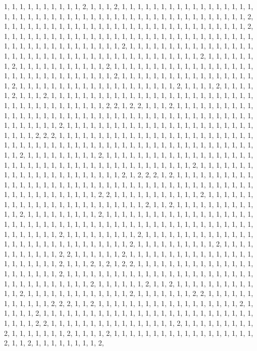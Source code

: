 \documentclass[
]{article}
\begin{document}
\begin{Schunk}
\begin{Soutput}
1, 1, 1, 1, 1, 1, 1, 1, 1, 1, 2, 1, 1, 1, 2, 1, 1, 1, 1, 1, 1, 1, 1, 1, 1, 1, 1, 1, 1, 1, 1, 1, 1, 1, 1, 1, 1, 1, 1, 1, 1, 1, 1, 1, 1, 1, 1, 1, 1, 1, 1, 1, 1, 1, 1, 1, 1, 1, 1, 1, 1, 1, 1, 2, 1, 1, 1, 1, 1, 1, 1, 1, 1, 1, 1, 1, 1, 1, 1, 1, 1, 1, 1, 1, 1, 1, 1, 1, 1, 1, 1, 1, 1, 1, 1, 2, 1, 1, 1, 1, 1, 1, 1, 1, 1, 1, 1, 1, 1, 1, 1, 1, 1, 1, 1, 1, 1, 1, 1, 1, 1, 1, 1, 1, 1, 1, 1, 1, 1, 1, 1, 1, 1, 1, 1, 1, 1, 1, 1, 1, 1, 1, 1, 2, 1, 1, 1, 1, 1, 1, 1, 1, 1, 1, 1, 1, 1, 1, 1, 1, 1, 1, 1, 1, 1, 1, 1, 1, 1, 1, 1, 1, 1, 1, 1, 1, 1, 1, 1, 1, 1, 1, 1, 1, 1, 2, 1, 1, 1, 1, 1, 1, 1, 2, 1, 1, 1, 1, 1, 1, 1, 1, 1, 1, 1, 2, 1, 1, 1, 1, 1, 1, 1, 1, 1, 1, 1, 1, 1, 1, 1, 1, 1, 1, 1, 1, 1, 1, 1, 1, 1, 1, 1, 1, 1, 1, 1, 1, 2, 1, 1, 1, 1, 1, 1, 1, 1, 1, 1, 1, 1, 1, 1, 1, 1, 1, 1, 2, 1, 1, 1, 1, 1, 1, 1, 1, 1, 1, 1, 1, 1, 1, 1, 1, 1, 1, 1, 1, 2, 1, 1, 1, 1, 2, 1, 1, 1, 1, 1, 2, 1, 1, 1, 2, 1, 1, 1, 1, 1, 1, 1, 1, 1, 1, 1, 1, 1, 1, 1, 1, 1, 1, 1, 1, 1, 1, 1, 1, 1, 1, 1, 1, 1, 1, 1, 1, 1, 1, 1, 1, 1, 1, 1, 2, 2, 1, 2, 2, 1, 1, 1, 2, 1, 1, 1, 1, 1, 1, 1, 1, 1, 1, 1, 1, 1, 1, 1, 1, 1, 1, 1, 1, 1, 1, 1, 1, 1, 1, 1, 1, 1, 1, 1, 1, 1, 1, 1, 1, 1, 1, 1, 1, 1, 1, 1, 1, 1, 1, 1, 1, 1, 2, 1, 1, 1, 1, 1, 1, 1, 1, 1, 1, 1, 1, 1, 1, 1, 1, 1, 1, 1, 1, 1, 1, 1, 1, 1, 1, 1, 1, 2, 2, 2, 1, 1, 1, 1, 1, 1, 1, 1, 1, 1, 1, 1, 1, 1, 1, 1, 1, 1, 1, 1, 1, 1, 1, 1, 1, 1, 1, 1, 1, 1, 1, 1, 1, 1, 1, 1, 1, 1, 1, 1, 1, 1, 1, 1, 1, 1, 1, 1, 1, 1, 1, 1, 1, 1, 1, 1, 1, 1, 1, 2, 1, 1, 1, 1, 1, 1, 1, 1, 1, 2, 1, 1, 1, 1, 1, 1, 1, 1, 1, 1, 1, 1, 1, 1, 1, 1, 1, 1, 1, 1, 1, 1, 1, 1, 1, 1, 1, 1, 1, 1, 1, 1, 1, 1, 1, 1, 1, 1, 1, 1, 1, 1, 1, 2, 1, 1, 1, 1, 1, 1, 1, 1, 1, 1, 1, 1, 1, 1, 1, 1, 1, 1, 1, 1, 1, 1, 2, 1, 2, 2, 2, 1, 2, 1, 1, 1, 1, 1, 1, 1, 1, 1, 1, 1, 1, 1, 1, 1, 1, 1, 1, 1, 1, 1, 1, 1, 1, 1, 1, 1, 1, 1, 1, 1, 1, 1, 1, 1, 1, 1, 1, 1, 1, 1, 1, 1, 1, 1, 1, 1, 1, 1, 1, 1, 1, 1, 1, 2, 2, 1, 1, 1, 1, 1, 1, 1, 1, 1, 1, 1, 2, 1, 1, 1, 1, 1, 1, 1, 1, 1, 1, 1, 1, 1, 1, 1, 1, 1, 1, 1, 1, 1, 1, 1, 1, 2, 1, 1, 2, 1, 1, 1, 1, 1, 1, 1, 1, 1, 1, 1, 1, 2, 1, 1, 1, 1, 1, 1, 1, 1, 1, 2, 1, 1, 1, 1, 1, 1, 1, 1, 1, 1, 1, 1, 1, 1, 1, 1, 1, 1, 1, 1, 1, 1, 1, 1, 1, 1, 1, 1, 1, 1, 1, 1, 1, 1, 1, 1, 1, 1, 1, 1, 1, 1, 1, 1, 1, 1, 1, 1, 1, 1, 1, 1, 1, 1, 1, 1, 1, 1, 2, 1, 1, 1, 1, 1, 1, 1, 1, 1, 2, 1, 1, 1, 1, 1, 1, 1, 1, 1, 1, 1, 1, 1, 1, 1, 1, 1, 1, 1, 1, 1, 1, 1, 1, 1, 1, 1, 1, 1, 1, 2, 1, 1, 1, 1, 1, 1, 1, 1, 1, 1, 2, 1, 1, 1, 1, 1, 1, 1, 1, 1, 1, 1, 2, 2, 1, 1, 1, 1, 1, 1, 2, 1, 1, 1, 1, 1, 1, 1, 1, 1, 1, 1, 1, 1, 1, 1, 1, 1, 1, 1, 1, 1, 1, 1, 2, 1, 1, 1, 2, 1, 2, 1, 2, 2, 1, 1, 1, 1, 1, 1, 1, 1, 1, 1, 1, 1, 1, 1, 1, 1, 1, 1, 1, 1, 1, 1, 2, 1, 1, 1, 1, 1, 1, 1, 1, 1, 1, 1, 1, 1, 1, 1, 1, 1, 1, 1, 1, 1, 1, 1, 1, 1, 1, 1, 1, 1, 1, 1, 1, 1, 1, 1, 2, 1, 1, 1, 1, 1, 1, 2, 1, 1, 2, 1, 1, 1, 1, 1, 1, 1, 1, 1, 1, 1, 1, 2, 1, 1, 1, 1, 1, 1, 1, 1, 1, 1, 1, 1, 1, 2, 1, 1, 1, 1, 1, 1, 1, 2, 2, 1, 1, 1, 1, 1, 1, 1, 1, 1, 1, 1, 1, 2, 2, 2, 1, 1, 2, 1, 1, 1, 1, 1, 1, 1, 1, 1, 1, 1, 1, 1, 1, 1, 1, 1, 1, 2, 1, 1, 1, 1, 1, 2, 1, 1, 1, 1, 1, 1, 1, 1, 1, 1, 1, 1, 1, 1, 1, 1, 1, 1, 1, 1, 1, 1, 1, 1, 1, 1, 1, 1, 1, 1, 1, 2, 2, 1, 1, 1, 1, 1, 1, 1, 1, 1, 1, 1, 1, 1, 1, 1, 1, 2, 1, 1, 1, 1, 1, 1, 1, 1, 1, 2, 1, 1, 1, 1, 1, 1, 1, 2, 1, 1, 1, 1, 2, 1, 1, 1, 1, 1, 1, 1, 1, 1, 1, 1, 1, 1, 1, 1, 1, 1, 1, 2, 1, 1, 2, 1, 1, 1, 1, 1, 1, 1, 1, 2, 
\end{Soutput}
\end{Schunk}
\end{document}
